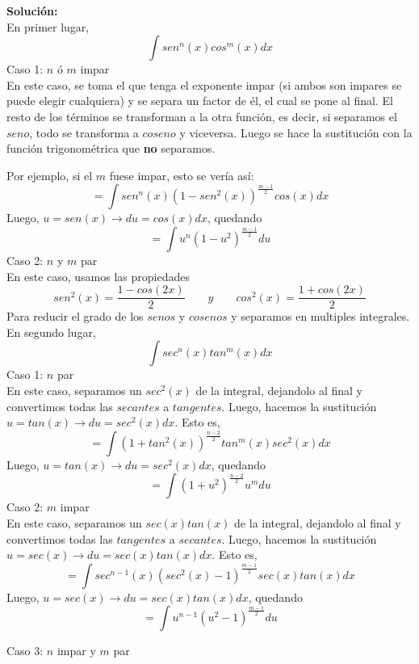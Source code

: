\documentclass[12pt]{article}
\newenvironment{solucion}
{\begin{mdframed}[backgroundcolor=black!10]
		{\bf Solución:}\\
	}
	{
	\end{mdframed}
}
\newenvironment{preguntas}
{\begin{enumerate}\itemsep12pt
	}
	{
	\end{enumerate}
}
\newcommand{\ra}{\rightarrow}
\begin{document}
\begin{preguntas}
\begin{solucion}
En primer lugar,
$$\displaystyle\int sen^n(x)cos^m(x)dx$$
Caso 1: $n$ ó $m$ impar\\

En este caso, se toma el que tenga el exponente impar (si ambos son impares se puede elegir cualquiera) y se separa un factor de él, el cual se pone al final. El resto de los términos se transforman a la otra función, es decir, si separamos el $seno$, todo se transforma a $coseno$ y viceversa. Luego se hace la sustitución con la función trigonométrica que \textbf{no} separamos.

Por ejemplo, si el $m$ fuese impar, esto se vería así:
$$= \displaystyle\int sen^n(x)(1-sen^2(x))^{\frac{m-1}{2}}cos(x)dx$$
Luego, $u = sen(x) \ra du = cos(x)dx$, quedando
$$= \displaystyle\int u^n(1-u^2)^{\frac{m-1}{2}}du$$
Caso 2: $n$ y $m$ par\\

En este caso, usamos las propiedades
$$sen^2(x) = \dfrac{1-cos(2x)}{2} \qquad y \qquad cos^2(x) = \dfrac{1+cos(2x)}{2}$$
Para reducir el grado de los $senos$ y $cosenos$ y separamos en multiples integrales.\\

En segundo lugar,
$$\displaystyle\int sec^n(x)tan^m(x)dx$$
Caso 1: $n$ par\\

En este caso, separamos un $sec^2(x)$ de la integral, dejandolo al final y convertimos todas las $secantes$ a $tangentes$. Luego, hacemos la sustitución $u = tan(x) \ra du = sec^2(x)dx$. Esto es,
$$=\displaystyle\int (1+tan^2(x))^{\frac{n-2}{2}}tan^m(x)sec^2(x)dx$$
Luego, $u = tan(x) \ra du = sec^2(x)dx$, quedando
$$=\displaystyle\int (1+u^2)^{\frac{n-2}{2}}u^m du$$
Caso 2: $m$ impar\\

En este caso, separamos un $sec(x)tan(x)$ de la integral, dejandolo al final y convertimos todas las $tangentes$ a $secantes$. Luego, hacemos la sustitución $u = sec(x) \ra du = sec(x)tan(x)dx$. Esto es,
$$=\displaystyle\int sec^{n-1}(x)(sec^2(x) - 1)^{\frac{m-1}{2}}sec(x)tan(x)dx$$
Luego, $u = sec(x) \ra du = sec(x)tan(x)dx$, quedando
$$=\displaystyle\int u^{n-1}(u^2 - 1)^{\frac{m-1}{2}}du$$

Caso 3: $n$ impar y $m$ par\\


\end{solucion}
\end{preguntas}
\end{document}
